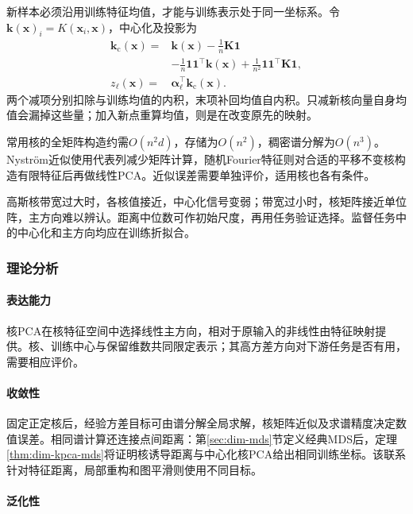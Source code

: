 新样本必须沿用训练特征均值，才能与训练表示处于同一坐标系。令$\bm{k}(\bm{x})_i=K(\bm{x}_i,\bm{x})$，中心化及投影为
\begin{equation}
  \label{eq:dim-kpca-extension}
  \begin{aligned}
    \bm{k}_{\mathrm{c}}(\bm{x})
      ={}&\bm{k}(\bm{x})-\frac1n\bm{K}\bm{1}\\
         &-\frac1n\bm{1}\bm{1}^{\top}\bm{k}(\bm{x})
          +\frac1{n^2}\bm{1}\bm{1}^{\top}\bm{K}\bm{1},\\
    z_\ell(\bm{x})
      ={}&\bm{\alpha}_\ell^{\top}\bm{k}_{\mathrm{c}}(\bm{x}).
  \end{aligned}
\end{equation}
两个减项分别扣除与训练均值的内积，末项补回均值自内积。只减新核向量自身均值会漏掉这些量；加入新点重算均值，则是在改变原先的映射。

常用核的全矩阵构造约需$O(n^2d)$，存储为$O(n^2)$，稠密谱分解为$O(n^3)$。Nystr\"om近似使用代表列减少矩阵计算，随机Fourier特征则对合适的平移不变核构造有限特征后再做线性PCA。近似误差需要单独评价，适用核也各有条件。

高斯核带宽过大时，各核值接近，中心化信号变弱；带宽过小时，核矩阵接近单位阵，主方向难以辨认。距离中位数可作初始尺度，再用任务验证选择。监督任务中的中心化和主方向均应在训练折拟合。

\subsubsection{理论分析}
\label{sec:dim-kpca-theory}

\paragraph{表达能力}
核PCA在核特征空间中选择线性主方向，相对于原输入的非线性由特征映射提供。核、训练中心与保留维数共同限定表示；其高方差方向对下游任务是否有用，需要相应评价。

\paragraph{收敛性}

固定正定核后，经验方差目标可由谱分解全局求解，核矩阵近似及求谱精度决定数值误差。相同谱计算还连接点间距离：第\ref{sec:dim-mds}节定义经典MDS后，定理\ref{thm:dim-kpca-mds}将证明核诱导距离与中心化核PCA给出相同训练坐标。该联系针对特征距离，局部重构和图平滑则使用不同目标。

\paragraph{泛化性}

